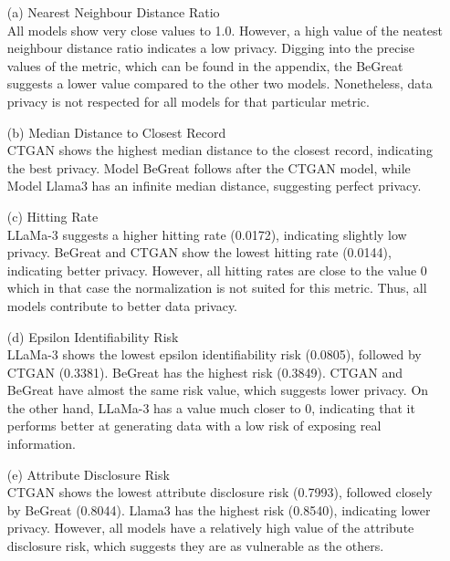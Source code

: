 \begin{enumerate}
    \item[(a)] Nearest Neighbour Distance Ratio \\
    All models show very close values to 1.0. However, a high value of the neatest neighbour distance ratio indicates a low privacy. Digging into the precise values of the metric, which can be found in the appendix, the BeGreat suggests a lower value compared to the other two models. Nonetheless, data privacy is not respected for all models for that particular metric.

    \item[(b)] Median Distance to Closest Record \\
    CTGAN shows the highest median distance to the closest record, indicating the best privacy. Model BeGreat follows after the CTGAN model, while Model Llama3 has an infinite median distance, suggesting perfect privacy. %

    
    \item[(c)] Hitting Rate \\
    LLaMa-3 suggests a higher hitting rate (0.0172), indicating slightly low privacy. BeGreat and CTGAN show the lowest hitting rate (0.0144), indicating better privacy. However, all hitting rates are close to the value 0 which in that case the normalization is not suited for this metric. Thus, all models contribute to better data privacy.


    \item[(d)] Epsilon Identifiability Risk \\
    LLaMa-3 shows the lowest epsilon identifiability risk (0.0805), followed by CTGAN (0.3381). BeGreat has the highest risk (0.3849). CTGAN and BeGreat have almost the same risk value, which suggests lower privacy. On the other hand, LLaMa-3 has a value much closer to 0, indicating that it performs better at generating data with a low risk of exposing real information. 

    \item[(e)] Attribute Disclosure Risk \\
    CTGAN shows the lowest attribute disclosure risk (0.7993), followed closely by BeGreat (0.8044). Llama3 has the highest risk (0.8540), indicating lower privacy. However, all models have a relatively high value of the attribute disclosure risk, which suggests they are as vulnerable as the others. %
    
\end{enumerate}

